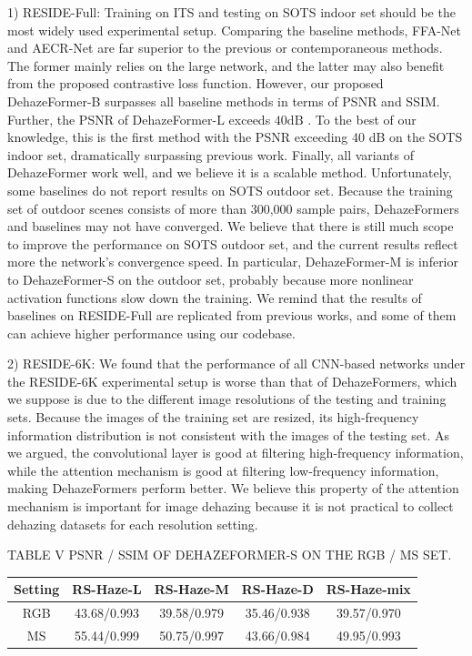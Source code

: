 1) RESIDE-Full: Training on ITS and testing on SOTS indoor set should be the most widely used experimental setup. Comparing the baseline methods, FFA-Net and AECR-Net are far superior to the previous or contemporaneous methods. The former mainly relies on the large network, and the latter may also benefit from the proposed contrastive loss function. However, our proposed DehazeFormer-B surpasses all baseline methods in terms of PSNR and SSIM. Further, the PSNR of DehazeFormer-L exceeds $40\mathrm{dB}$ . To the best of our knowledge, this is the first method with the PSNR exceeding 40 dB on the SOTS indoor set, dramatically surpassing previous work. Finally, all variants of DehazeFormer work well, and we believe it is a scalable method. Unfortunately, some baselines do not report results on SOTS outdoor set. Because the training set of outdoor scenes consists of more than 300,000 sample pairs, DehazeFormers and baselines may not have converged. We believe that there is still much scope to improve the performance on SOTS outdoor set, and the current results reflect more the network’s convergence speed. In particular, DehazeFormer-M is inferior to DehazeFormer-S on the outdoor set, probably because more nonlinear activation functions slow down the training. We remind that the results of baselines on RESIDE-Full are replicated from previous works, and some of them can achieve higher performance using our codebase.

2) RESIDE-6K: We found that the performance of all CNN-based networks under the RESIDE-6K experimental setup is worse than that of DehazeFormers, which we suppose is due to the different image resolutions of the testing and training sets. Because the images of the training set are resized, its high-frequency information distribution is not consistent with the images of the testing set. As we argued, the convolutional layer is good at filtering high-frequency information, while the attention mechanism is good at filtering low-frequency information, making DehazeFormers perform better. We believe this property of the attention mechanism is important for image dehazing because it is not practical to collect dehazing datasets for each resolution setting.

TABLE V PSNR / SSIM OF DEHAZEFORMER-S ON THE RGB / MS SET.


\begin{table}[htbp]
\centering
\begin{tabular}{|c|c|c|c|c|}\hline
Setting & RS-Haze-L & RS-Haze-M & RS-Haze-D & RS-Haze-mix \\ \hline
RGB & 43.68/0.993 & 39.58/0.979 & 35.46/0.938 & 39.57/0.970 \\ \hline
MS & 55.44/0.999 & 50.75/0.997 & 43.66/0.984 & 49.95/0.993 \\ \hline
\end{tabular}\end{table}

